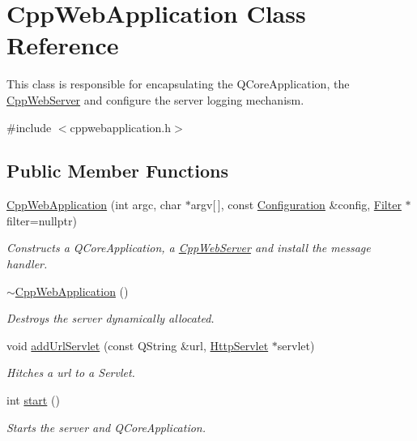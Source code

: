 \hypertarget{class_cpp_web_application}{}\section{Cpp\+Web\+Application Class Reference}
\label{class_cpp_web_application}


This class is responsible for encapsulating the Q\+Core\+Application, the \mbox{\hyperlink{class_cpp_web_server}{Cpp\+Web\+Server}} and configure the server logging mechanism.  




{\ttfamily \#include $<$cppwebapplication.\+h$>$}

\subsection*{Public Member Functions}
\begin{DoxyCompactItemize}
\item 
\mbox{\hyperlink{class_cpp_web_application_aeb4743e2dce64d0f23b5efd8e5933e27}{Cpp\+Web\+Application}} (int argc, char $\ast$argv\mbox{[}$\,$\mbox{]}, const \mbox{\hyperlink{class_configuration}{Configuration}} \&config, \mbox{\hyperlink{class_filter}{Filter}} $\ast$filter=nullptr)
\begin{DoxyCompactList}\small\item\em Constructs a Q\+Core\+Application, a \mbox{\hyperlink{class_cpp_web_server}{Cpp\+Web\+Server}} and install the message handler. \end{DoxyCompactList}\item 
\mbox{\label{class_cpp_web_application_a96a7655a25d2e35ed545cdb7b8d81cc5}} 
\mbox{\hyperlink{class_cpp_web_application_a96a7655a25d2e35ed545cdb7b8d81cc5}{$\sim$\+Cpp\+Web\+Application}} ()
\begin{DoxyCompactList}\small\item\em Destroys the server dynamically allocated. \end{DoxyCompactList}\item 
void \mbox{\hyperlink{class_cpp_web_application_aa8c0b5330f0133fc478b921f2a05dcec}{add\+Url\+Servlet}} (const Q\+String \&url, \mbox{\hyperlink{class_http_servlet}{Http\+Servlet}} $\ast$servlet)
\begin{DoxyCompactList}\small\item\em Hitches a url to a Servlet. \end{DoxyCompactList}\item 
int \mbox{\hyperlink{class_cpp_web_application_a1e9f2c789934748d6b7c29ad33e9d7c9}{start}} ()
\begin{DoxyCompactList}\small\item\em Starts the server and Q\+Core\+Application. \end{DoxyCompactList}\end{DoxyCompactItemize}


